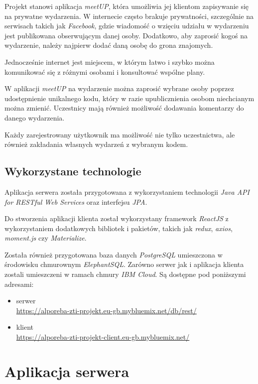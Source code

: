 \documentclass[12pt]{article}
\begin{document}
Projekt stanowi aplikacja \textit{meetUP}, która umożliwia jej klientom zapisywanie się na prywatne wydarzenia. W internecie często brakuje prywatności, szczególnie na serwisach takich jak \textit{Facebook}, gdzie wiadomość o wzięciu udziału w wydarzeniu jest publikowana obserwującym danej osoby. Dodatkowo, aby zaprosić kogoś na wydarzenie, należy najpierw dodać daną osobę do grona znajomych.

Jednocześnie internet jest miejscem, w którym łatwo i szybko można komunikować się z różnymi osobami i konsultować wspólne plany.

W aplikacji \textit{meetUP} na wydarzenie można zaprosić wybrane osoby poprzez udostępnienie unikalnego kodu, który w razie upublicznienia osobom niechcianym można zmienić. Uczestnicy mają również możliwość dodawania komentarzy do danego wydarzenia.

Każdy zarejestrowany użytkownik ma możliwość nie tylko uczestnictwa, ale również zakładania własnych wydarzeń z wybranym kodem.


\subsection{Wykorzystane technologie}
Aplikacja serwera została przygotowana z wykorzystaniem technologii \textit{Java API for RESTful Web Services} oraz interfejsu \textit{JPA}.

Do stworzenia aplikacji klienta został wykorzystany framework \textit{ReactJS} z wykorzystaniem dodatkowych bibliotek i pakietów, takich jak \textit{redux}, \textit{axios}, \textit{moment.js} czy \textit{Materialize}.

Została również przygotowana baza danych \textit{PostgreSQL} umieszczona w środowisku chmurownym \textit{ElephantSQL}. Zarówno serwer jak i aplikacja klienta zostali umieszczeni w ramach chmury \textit{IBM Cloud}. Są dostępne pod poniższymi adresami:
\begin{itemize}
\item serwer \\ \url{https://alporeba-zti-projekt.eu-gb.mybluemix.net/db/rest/}
\item klient \\ \url{https://alporeba-zti-projekt-client.eu-gb.mybluemix.net/}
\end{itemize}

\pagebreak
\section{Aplikacja serwera}
\end{document}
